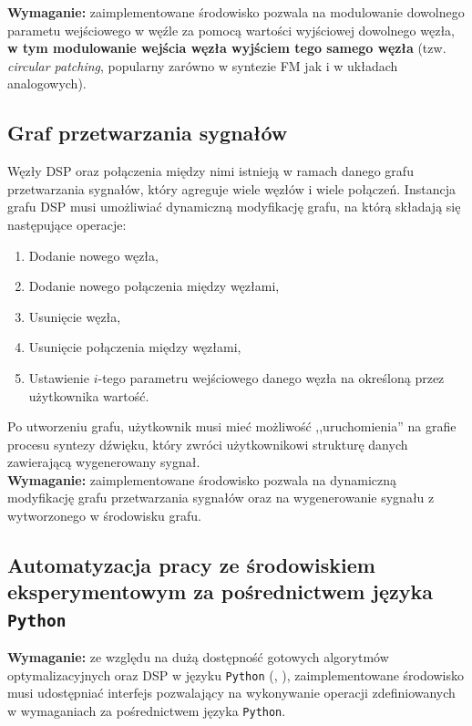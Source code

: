 \noindent
\textbf{Wymaganie:} zaimplementowane środowisko pozwala na modulowanie
dowolnego parametu wejściowego w węźle za pomocą wartości wyjściowej dowolnego węzła,
\textbf{w tym modulowanie wejścia węzła wyjściem tego samego węzła} (tzw. \textit{circular patching},
popularny zarówno w syntezie FM jak i w układach analogowych).

\subsection{Graf przetwarzania sygnałów}

Węzły DSP oraz połączenia między nimi istnieją w ramach danego grafu przetwarzania sygnałów, który agreguje
wiele węzłów i wiele połączeń. Instancja grafu DSP musi umożliwiać dynamiczną modyfikację grafu, na którą składają się następujące operacje:

\begin{enumerate}
  \item Dodanie nowego węzła,
  \item Dodanie nowego połączenia między węzłami,
  \item Usunięcie węzła,
  \item Usunięcie połączenia między węzłami,
  \item Ustawienie $i$-tego parametru wejściowego danego węzła na określoną przez użytkownika wartość.
\end{enumerate}

\noindent
Po utworzeniu grafu, użytkownik musi mieć możliwość ,,uruchomienia'' na grafie procesu syntezy dźwięku,
który zwróci użytkownikowi strukturę danych zawierającą wygenerowany sygnał. \\

\noindent
\textbf{Wymaganie:} zaimplementowane środowisko pozwala na dynamiczną modyfikację grafu przetwarzania sygnałów oraz na 
wygenerowanie sygnału z wytworzonego w środowisku grafu.


\subsection{Automatyzacja pracy ze środowiskiem eksperymentowym za pośrednictwem języka \texttt{Python}}

\textbf{Wymaganie:} ze względu na dużą dostępność gotowych algorytmów optymalizacyjnych oraz DSP w języku \texttt{Python}
(\cite{librosa}, \cite{2020SciPy-NMeth}), zaimplementowane środowisko musi udostępniać interfejs pozwalający
na wykonywanie operacji zdefiniowanych w wymaganiach za pośrednictwem języka \texttt{Python}.

